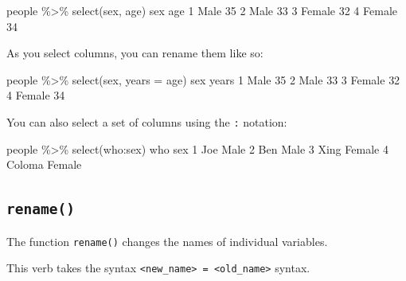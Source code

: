 \documentclass[
]{book}
\newenvironment{Shaded}{\begin{snugshade}}{\end{snugshade}}
\newcommand{\AttributeTok}[1]{\textcolor[rgb]{0.77,0.63,0.00}{#1}}
\newcommand{\DecValTok}[1]{\textcolor[rgb]{0.00,0.00,0.81}{#1}}
\newcommand{\FunctionTok}[1]{\textcolor[rgb]{0.00,0.00,0.00}{#1}}
\newcommand{\NormalTok}[1]{#1}
\newcommand{\SpecialCharTok}[1]{\textcolor[rgb]{0.00,0.00,0.00}{#1}}
\begin{document}
\begin{Shaded}
\begin{Highlighting}[]
\NormalTok{people }\SpecialCharTok{\%\textgreater{}\%} \FunctionTok{select}\NormalTok{(sex, age)}
\NormalTok{     sex age}
\DecValTok{1}\NormalTok{   Male  }\DecValTok{35}
\DecValTok{2}\NormalTok{   Male  }\DecValTok{33}
\DecValTok{3}\NormalTok{ Female  }\DecValTok{32}
\DecValTok{4}\NormalTok{ Female  }\DecValTok{34}
\end{Highlighting}
\end{Shaded}

As you select columns, you can rename them like so:

\begin{Shaded}
\begin{Highlighting}[]
\NormalTok{people }\SpecialCharTok{\%\textgreater{}\%} \FunctionTok{select}\NormalTok{(sex, }\AttributeTok{years =}\NormalTok{ age)}
\NormalTok{     sex years}
\DecValTok{1}\NormalTok{   Male    }\DecValTok{35}
\DecValTok{2}\NormalTok{   Male    }\DecValTok{33}
\DecValTok{3}\NormalTok{ Female    }\DecValTok{32}
\DecValTok{4}\NormalTok{ Female    }\DecValTok{34}
\end{Highlighting}
\end{Shaded}

You can also select a set of columns using the \texttt{:} notation:

\begin{Shaded}
\begin{Highlighting}[]
\NormalTok{people }\SpecialCharTok{\%\textgreater{}\%} \FunctionTok{select}\NormalTok{(who}\SpecialCharTok{:}\NormalTok{sex)}
\NormalTok{     who    sex}
\DecValTok{1}\NormalTok{    Joe   Male}
\DecValTok{2}\NormalTok{    Ben   Male}
\DecValTok{3}\NormalTok{   Xing Female}
\DecValTok{4}\NormalTok{ Coloma Female}
\end{Highlighting}
\end{Shaded}

\hypertarget{rename}{%
\subsection*{\texorpdfstring{\texttt{rename()}}{rename()}}\label{rename}}

The function \texttt{rename()} changes the names of individual variables.

This verb takes the syntax \texttt{\textless{}new\_name\textgreater{}\ =\ \textless{}old\_name\textgreater{}} syntax.
\end{document}

